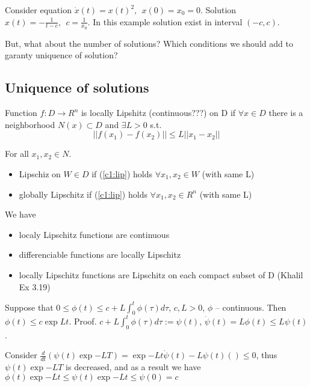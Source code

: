 Consider equation $\dot x(t) = x(t)^2, \ \ x(0)=x_0=0$. Solution 
$x(t)=-\frac{1}{t-c}, \ \ c=\frac{1}{x_0}$. In this example
solution exist in interval $(-c, c)$.


But, what about the number of solutions? Which conditions we should
add to garanty uniquence of solution?


\subsection{Uniquence of solutions}

Function $f:D \rightarrow R^n$ is locally Lipshitz (continuous???) on D
if $\forall x \in D$ there is a neighborhood $N(x) \subset D$ and
$\exists L > 0$ s.t. 
\begin{equation}\label{c1:lip}
||f(x_1)-f(x_2)|| \le L ||x_1 - x_2|| 
\end{equation}

For all $x_1,x_2 \in N$.

\begin{itemize}
\item Lipschiz on $W \in D$ if (\ref{c1:lip}) holds $\forall x_1,x_2 \in W$ 
(with same L)
\item globally Lipschitz if (\ref{c1:lip}) holds $\forall x_1, x_2 \in R^n$
(with same L)
\end{itemize}


We have
\begin{itemize}[label=$\#$]
 \item localy Lipschitz functions are continuous
 \item differenciable functions are locally Lipschitz
 \item locally Lipschitz functions are Lipschitz on each compact subset of D
 	(Khalil Ex 3.19)
\end{itemize}

Suppose that $0 \le \phi(t) \le c + L \int^t_0 \phi(\tau) d \tau$, $c,L > 0$, $\phi$ -- 
continuous. Then $\phi(t) \le c \exp{Lt}$.
Proof. $c + L\int^t_0 \phi(\tau) d \tau := \psi(t)$, $\dot \psi(t) = L\phi(t) \le L \psi (t)$.

Consider $\frac{d}{dt} \left(\psi(t) \exp{-LT}\right) = \exp{-Lt}
\dot \psi(t)-L \psi(t) \left(\right) \le 0$, thus $\psi(t) \exp{-LT}$ is
decreased, and as a result we have $\phi(t)\exp{-Lt}\le \psi(t)\exp{-Lt}\le \psi(0)=c$ 

